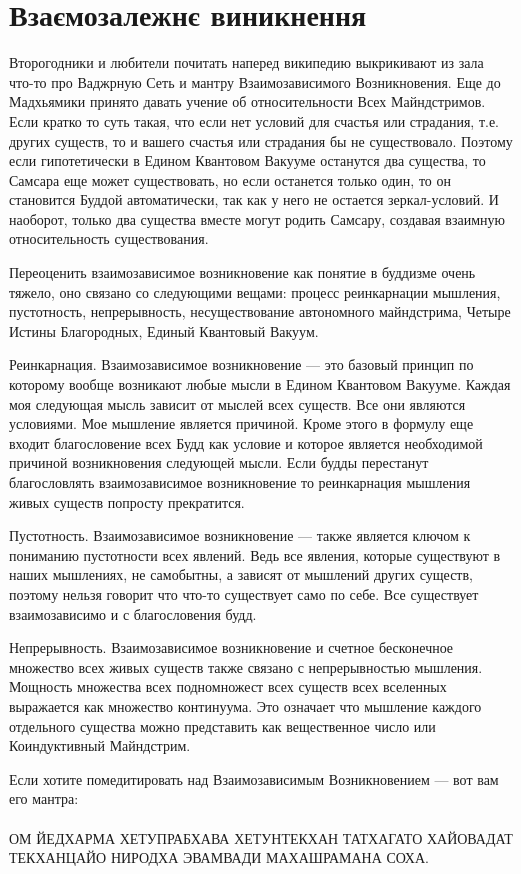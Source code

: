 \section{Взаємозалежнє виникнення}

Второгодники и любители почитать наперед википедию выкрикивают из зала что-то про Ваджрную Сеть и мантру Взаимозависимого Возникновения. Еще до Мадхьямики принято давать учение об относительности Всех Майндстримов. Если кратко то суть такая, что если нет условий для счастья или страдания, т.е. других существ, то и вашего счастья или страдания бы не существовало. Поэтому если гипотетически в Едином Квантовом Вакууме останутся два существа, то Самсара еще может существовать, но если останется только один, то он становится Буддой автоматически, так как у него не остается зеркал-условий. И наоборот, только два существа вместе могут родить Самсару, создавая взаимную относительность существования.

Переоценить взаимозависимое возникновение как понятие в буддизме очень тяжело, оно связано со следующими вещами:  процесс реинкарнации мышления, пустотность, непрерывность, несуществование автономного майндстрима, Четыре Истины Благородных, Единый Квантовый Вакуум.

Реинкарнация. Взаимозависимое возникновение — это базовый принцип по которому вообще возникают любые мысли в Едином Квантовом Вакууме. Каждая моя следующая мысль зависит от мыслей всех существ. Все они являются условиями. Мое мышление является причиной. Кроме этого в формулу еще входит благословение всех Будд как условие и которое является необходимой причиной возникновения следующей мысли. Если будды перестанут благословлять взаимозависимое возникновение то реинкарнация мышления живых существ попросту прекратится.

Пустотность. Взаимозависимое возникновение — также является ключом к пониманию пустотности всех явлений. Ведь все явления, которые существуют в наших мышлениях, не самобытны, а зависят от мышлений других существ, поэтому нельзя говорит что что-то существует само по себе. Все существует взаимозависимо и с благословения будд.

Непрерывность. Взаимозависимое возникновение и счетное бесконечное множество всех живых существ также связано с непрерывностью мышления. Мощность множества всех подномножест всех существ всех вселенных выражается как множество континуума. Это означает что мышление каждого отдельного существа можно представить как вещественное число или Коиндуктивный Майндстрим.

Если хотите помедитировать над Взаимозависимым Возникновением — вот вам его мантра:
\\
\\
ОМ ЙЕДХАРМА ХЕТУПРАБХАВА ХЕТУНТЕКХАН  ТАТХАГАТО ХАЙОВАДАТ ТЕКХАНЦАЙО  НИРОДХА ЭВАМВАДИ МАХАШРАМАНА СОХА.


